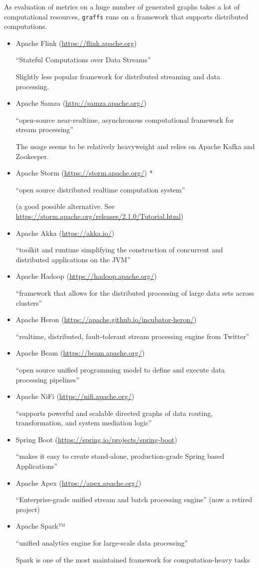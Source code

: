As evaluation of metrics on a huge number of generated graphs takes a lot of computational resources, \texttt{graffs} runs on a framework that supports distributed computations.

\begin{itemize}
    \item Apache Flink (\url{https://flink.apache.org})

    \enquote{Stateful Computations over Data Streams}

    Slightly less popular framework for distributed streaming and data processing.
    \item Apache Samza (\url{http://samza.apache.org/})

    \enquote{open-source near-realtime, asynchronous computational framework for stream processing}

    The usage seems to be relatively heavyweight and relies on Apache Kafka and Zookeeper.
    \item Apache Storm (\url{https://storm.apache.org/}) *

    \enquote{open source distributed realtime computation system}

    (a good possible alternative.
    See \url{https://storm.apache.org/releases/2.1.0/Tutorial.html})
    \item Apache Akka (\url{https://akka.io/})

    \enquote{toolkit and runtime simplifying the construction of concurrent and distributed applications on the JVM}
    \item Apache Hadoop (\url{https://hadoop.apache.org/})

    \enquote{framework that allows for the distributed processing of large data sets across clusters}
    \item Apache Heron (\url{https://apache.github.io/incubator-heron/})

    \enquote{realtime, distributed, fault-tolerant stream processing engine from Twitter}
    \item Apache Beam (\url{https://beam.apache.org/})

    \enquote{open source unified programming model to define and execute data processing pipelines}
    \item Apache NiFi (\url{https://nifi.apache.org/})

    \enquote{supports powerful and scalable directed graphs of data routing, transformation, and system mediation logic}
    \item Spring Boot (\url{https://spring.io/projects/spring-boot})

    \enquote{makes it easy to create stand-alone, production-grade Spring based Applications}
    \item Apache Apex (\url{https://apex.apache.org/})

    \enquote{Enterprise-grade unified stream and batch processing engine} (now a retired project)
    \item Apache Spark™

    \enquote{unified analytics engine for large-scale data processing}

    Spark is one of the most maintained framework for computation-heavy tasks
\end{itemize}
